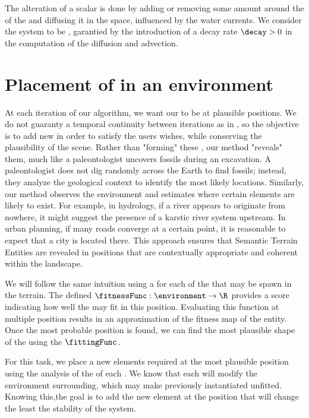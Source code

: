 The alteration of a scalar  is done by adding or removing some amount around the  of the  and diffusing it in the space, influenced by the water currents. We consider the system to be , garantied by the introduction of a decay rate $\decay > 0$ in the computation of the diffusion and advection.



\section{Placement of  in an environment}
\label{sec:env-obj_generation-rules}

At each iteration of our algorithm, we want our  to be at plausible positions. We do not guaranty a temporal continuity between iterations as in \citep{Ecormier-Nocca2021}, so the objective is to add new  in order to satisfy the users wishes, while conserving the plausibility of the scene. Rather than "forming" these , our method "reveals" them, much like a paleontologist uncovers fossils during an excavation. A paleontologist does not dig randomly across the Earth to find fossils; instead, they analyze the geological context to identify the most likely locations. Similarly, our method observes the environment and estimates where certain elements are likely to exist. For example, in hydrology, if a river appears to originate from nowhere, it might suggest the presence of a karstic river system upstream. In urban planning, if many roads converge at a certain point, it is reasonable to expect that a city is located there. This approach ensures that Semantic Terrain Entities are revealed in positions that are contextually appropriate and coherent within the landscape.

We will follow the same intuition using a  for each of the  that may be spawn in the terrain. The  defined $\fitnessFunc: \environment \to \R$ provides a score indicating how well the  may fit in this position. Evaluating this function at multiple position results in an approximation of the fitness map of the entity. Once the most probable position is found, we can find the most plausible shape of the  using the  $\fittingFunc$.

For this task, we place a new elements required at the most plausible position using the analysis of the  of each . We know that each  will modify the environment surrounding, which may make previously instantiated  unfitted. Knowing this,the goal is to add the new element at the position that will change the least the stability of the system. 

